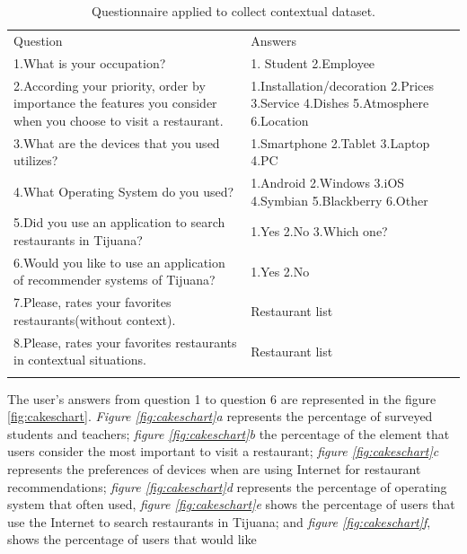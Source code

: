 \begin{table}
\small
\captionsetup{font=footnotesize}
\caption{Questionnaire applied to collect contextual dataset.}
\label{tab:questions} 
\centering
\small
\begin{tabular}{p{7cm} p{5cm} }
\hline\noalign{\smallskip}
Question & Answers \\
\noalign{\smallskip}\hline\noalign{\smallskip}
\small{1.What is your occupation?} & \small{1. Student 2.Employee} \\ \hline  
\small{2.According your priority, order by importance the features 
you consider when you choose to visit a restaurant.} & 
\small{1.Installation/decoration 2.Prices 3.Service 4.Dishes
5.Atmosphere 6.Location} \\ \hline  
\small{3.What are the devices that you used
utilizes?} & \small{1.Smartphone 2.Tablet 3.Laptop 4.PC} \\ \hline   
\small{4.What Operating System do you used?} & 
\small{1.Android 2.Windows 3.iOS 4.Symbian 5.Blackberry 6.Other}
\\ \hline  
\small{5.Did you use an application to search restaurants in Tijuana?} &
\small{1.Yes 2.No 3.Which one?} \\ \hline   
\small{6.Would you like to use an application of
recommender systems of Tijuana?} & \small{1.Yes 2.No} \\ \hline  
\small{7.Please, rates your favorites restaurants(without context).} & 
\small{Restaurant list} \\ \hline
\small{8.Please, rates your favorites restaurants in contextual situations.} & 
\small{Restaurant list} \\
\noalign{\smallskip}\hline
\end{tabular}
\end{table}
The user's answers from question 1 to question 6 are represented in
the figure \ref{fig:cakeschart}. \textit{Figure \ref{fig:cakeschart}a}
represents the percentage of surveyed students and teachers;
\textit{figure \ref{fig:cakeschart}b}  the percentage of the element
that users consider the most important to visit a restaurant;
\textit{figure \ref{fig:cakeschart}c} represents the preferences of
devices when are using Internet for restaurant recommendations;
\textit{figure \ref{fig:cakeschart}d} represents the percentage of
operating system that often used, \textit{figure
\ref{fig:cakeschart}e} shows the percentage of users that use the
Internet to search restaurants in Tijuana; and \textit{figure
\ref{fig:cakeschart}f}, shows the percentage of users that would like
